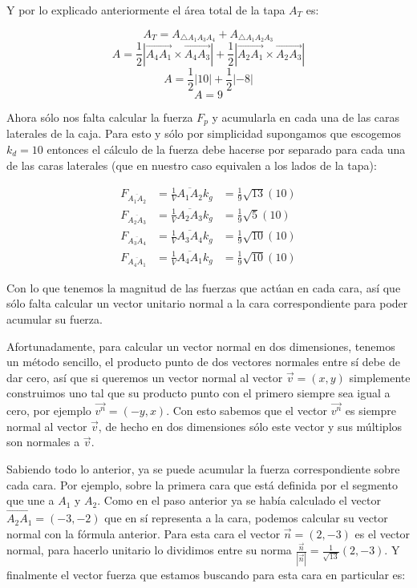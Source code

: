 Y por lo explicado anteriormente el área total de la tapa $A_T$ es:

$$ A_T = A_{\bigtriangleup A_1 A_3 A_4} + A_{\bigtriangleup A_1 A_2 A_3} $$
$$ A = \frac{1}{2} | \overrightarrow{A_4 A_1} \times \overrightarrow{A_4 A_3} | + \frac{1}{2} | \overrightarrow{A_2 A_1} \times \overrightarrow{A_2 A_3} |$$
$$A = \frac{1}{2} | 10 | + \frac{1}{2} | -8 |$$
$$A = 9$$

Ahora sólo nos falta calcular la fuerza $F_p$ y acumularla en cada una de las caras laterales de la caja. Para esto y sólo por simplicidad supongamos que escogemos $k_d = 10$ entonces el cálculo de la fuerza debe hacerse por separado para cada una de las caras laterales (que en nuestro caso equivalen a los lados de la tapa):

\begin{eqnarray}
F_{\overline{A_1 A_2}} & =  \frac{1}{V}\overline{A_1 A_2} k_g & = \frac{1}{9} \sqrt{13} \left( 10 \right) \nonumber \\
F_{\overline{A_2 A_3}} & =  \frac{1}{V}\overline{A_2 A_3} k_g & = \frac{1}{9} \sqrt{5}  \left( 10 \right) \nonumber \\
F_{\overline{A_3 A_4}} & =  \frac{1}{V}\overline{A_3 A_4} k_g & = \frac{1}{9} \sqrt{10} \left( 10 \right) \nonumber \\
F_{\overline{A_4 A_1}} & =  \frac{1}{V}\overline{A_4 A_1} k_g & = \frac{1}{9} \sqrt{10} \left( 10 \right) \nonumber
\end{eqnarray}

Con lo que tenemos la magnitud de las fuerzas que actúan en cada cara, así que sólo falta calcular un vector unitario normal a la cara correspondiente para poder acumular su fuerza.

Afortunadamente, para calcular un vector normal en dos dimensiones, tenemos un método sencillo, el producto punto de dos vectores normales entre sí debe de dar cero, así que si queremos un vector normal al vector $\vec{v}=(x, y)$ simplemente construimos uno tal que su producto punto con el primero siempre sea igual a cero, por ejemplo $\vec{v^n} = (-y, x)$. Con esto sabemos que el vector $\vec{v^n}$ es siempre normal al vector $\vec{v}$, de hecho en dos dimensiones sólo este vector y sus múltiplos son normales a $\vec{v}$.

Sabiendo todo lo anterior, ya se puede acumular la fuerza correspondiente sobre cada cara. Por ejemplo, sobre la primera cara que está definida por el segmento que une a $A_1$ y $A_2$. Como en el paso anterior ya se había calculado el vector $\overrightarrow{A_2A_1} = (-3,-2)$ que en sí representa a la cara, podemos calcular su vector normal con la fórmula anterior. Para esta cara el vector $\vec{n}=(2,-3)$ es el vector normal, para hacerlo unitario lo dividimos entre su norma $\frac{\vec{n}}{|\vec{n}|} = \frac{1}{\sqrt{13}} (2, -3)$. Y finalmente el vector fuerza que estamos buscando para esta cara en particular es:

